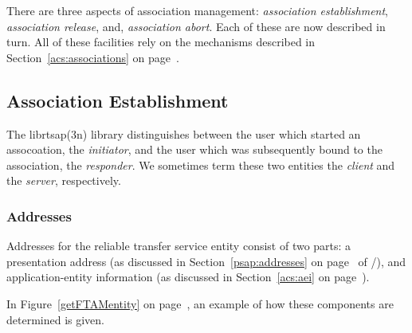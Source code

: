 There are three aspects of association management:
{\em association establishment},
{\em association release},
and,
{\em association abort}.
Each of these are now described in turn.
All of these facilities rely on the mechanisms described in
Section~\ref{acs:associations} on page~\pageref{acs:associations}.

\subsection	{Association Establishment}
The \man librtsap(3n) library distinguishes between the user which started an
assocoation,
the {\em initiator},
and the user which was subsequently bound to the association,
the {\em responder}.
We sometimes term these two entities the {\em client\/} and the {\em server},
respectively.

\subsubsection	{Addresses}
Addresses for the reliable transfer service entity consist of two parts:
a presentation address (as discussed in Section~\ref{psap:addresses} on
page~\pageref{psap:addresses} of \voltwo/),
and application-entity information
(as discussed in Section~\ref{acs:aei} on page~\pageref{acs:aei}).

In Figure~\ref{getFTAMentity} on page~\pageref{getFTAMentity},
an example of how these components are determined is given.

